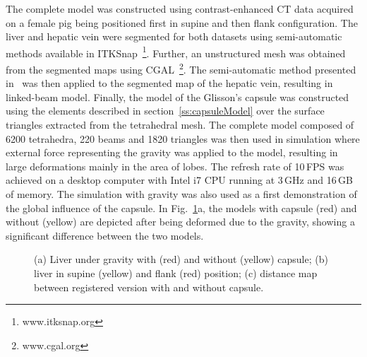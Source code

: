 \documentclass{llncs}
\begin{document}
The complete model was constructed using contrast-enhanced CT data acquired on a female pig 
being positioned first in supine and then flank configuration. 
The liver and hepatic vein were segmented for both datasets  using semi-automatic methods available in ITKSnap~\footnote{www.itksnap.org}.
Further, an unstructured mesh was obtained from the segmented maps using CGAL~\footnote{www.cgal.org}. 
The semi-automatic method presented in~\cite{Peterlik2012} was 
then applied to the segmented map of the hepatic vein, resulting in linked-beam model. 
Finally, the model of the Glisson's capsule was constructed using the elements described in 
section~\ref{ss:capsuleModel} over the surface triangles extracted from the tetrahedral mesh. 
The complete model composed of 6200 tetrahedra, 220 beams and 1820 triangles was then 
used in simulation where external force representing the gravity was applied to the model, 
resulting in large deformations mainly in the area of lobes. The refresh rate of 10\,FPS 
was achieved on a desktop computer with Intel i7 CPU running at 3\,GHz and 16\,GB of memory. 
The simulation with gravity was also used as a first demonstration of the global influence of the capsule. 
In Fig.~\ref{f:global}a, the models with capsule (red) and without (yellow) are depicted after being 
deformed due to the gravity, showing a significant difference between the two models.  

\begin{figure}[t]
  \centering
    \caption{\label{f:global}%
      (a) Liver under gravity with (red) and without (yellow) capsule;
      (b) liver in supine (yellow) and flank (red) position;
      (c) distance map between registered version with and without capsule.}
\end{figure}
\end{document}
